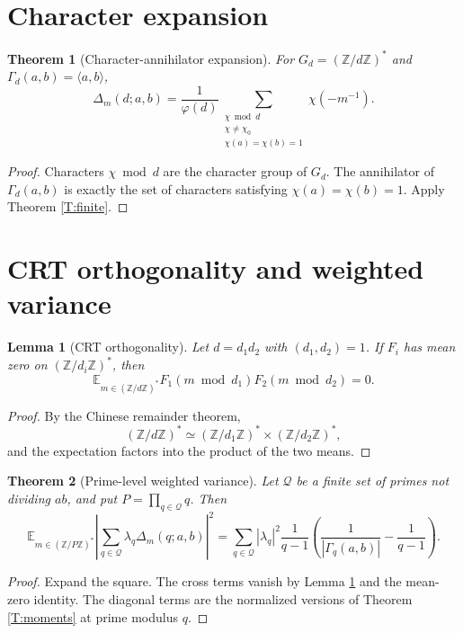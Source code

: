 \documentclass[11pt]{article}
\newtheorem{theorem}{Theorem}
\newtheorem{lemma}{Lemma}
\newcommand{\Z}{\mathbb Z}
\newcommand{\E}{\mathbb E}
\newcommand{\1}{\mathbf 1}
\begin{document}
\section{Character expansion}

\begin{theorem}[Character-annihilator expansion]\label{T:char}
For \(G_d=(\Z/d\Z)^*\) and \(\Gamma_d(a,b)=\langle a,b\rangle\),
\[
\Delta_m(d;a,b)=
\frac1{\varphi(d)}
\sum_{\substack{\chi\bmod d\\ \chi\ne\chi_0\\ \chi(a)=\chi(b)=1}}
\chi(-m^{-1}).
\]
\end{theorem}

\begin{proof}
Characters \(\chi\bmod d\) are the character group of \(G_d\).  The annihilator of \(\Gamma_d(a,b)\) is exactly the set of characters satisfying \(\chi(a)=\chi(b)=1\).  Apply Theorem \ref{T:finite}.
\end{proof}

\section{CRT orthogonality and weighted variance}

\begin{lemma}[CRT orthogonality]\label{L:crt}
Let \(d=d_1d_2\) with \((d_1,d_2)=1\).  If \(F_i\) has mean zero on \((\Z/d_i\Z)^*\), then
\[
\E_{m\in(\Z/d\Z)^*}F_1(m\bmod d_1)F_2(m\bmod d_2)=0.
\]
\end{lemma}

\begin{proof}
By the Chinese remainder theorem,
\[
(\Z/d\Z)^*\simeq(\Z/d_1\Z)^*\times(\Z/d_2\Z)^*,
\]
and the expectation factors into the product of the two means.
\end{proof}

\begin{theorem}[Prime-level weighted variance]\label{T:weighted}
Let \(\mathcal Q\) be a finite set of primes not dividing \(ab\), and put \(P=\prod_{q\in\mathcal Q}q\).  Then
\[
\E_{m\in(\Z/P\Z)^*}
\left|
\sum_{q\in\mathcal Q}\lambda_q\Delta_m(q;a,b)
\right|^2
=
\sum_{q\in\mathcal Q}
|\lambda_q|^2
\frac1{q-1}
\left(
\frac1{|\Gamma_q(a,b)|}-\frac1{q-1}
\right).
\]
\end{theorem}

\begin{proof}
Expand the square.  The cross terms vanish by Lemma \ref{L:crt} and the mean-zero identity.  The diagonal terms are the normalized versions of Theorem \ref{T:moments} at prime modulus \(q\).
\end{proof}
\end{document}
